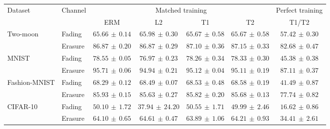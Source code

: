 \begin{tabular*}{\linewidth}{@{\extracolsep{\fill}}llccccc@{}}
\toprule
\multirow{2}{*}{Dataset} & \multirow{2}{*}{Channel} & \multicolumn{4}{c}{Matched training} & Perfect training \\
\cmidrule(lr){3-6}\cmidrule(l){7-7}
 & & ERM & L2 & T1 & T2 & T1/T2 \\
\midrule
\multirow{2}{*}{Two-moon} & Fading & $65.66\,\pm\,0.14$ & $\mathbf{65.98}\,\pm\,0.30$ & $65.67\,\pm\,0.58$ & $65.67\,\pm\,0.58$ & $57.42\,\pm\,0.30$ \\
 & Erasure & $86.87\,\pm\,0.20$ & $86.87\,\pm\,0.29$ & $87.10\,\pm\,0.36$ & $\mathbf{87.15}\,\pm\,0.33$ & $82.68\,\pm\,0.47$ \\
\midrule[0.25pt]
\multirow{2}{*}{MNIST} & Fading & $\mathbf{78.55}\,\pm\,0.05$ & $76.97\,\pm\,0.23$ & $78.26\,\pm\,0.34$ & $78.33\,\pm\,0.30$ & $45.38\,\pm\,0.38$ \\
 & Erasure & $\mathbf{95.71}\,\pm\,0.06$ & $94.94\,\pm\,0.21$ & $95.12\,\pm\,0.04$ & $95.11\,\pm\,0.19$ & $87.11\,\pm\,0.37$ \\
\midrule[0.25pt]
\multirow{2}{*}{Fashion-MNIST} & Fading & $68.29\,\pm\,0.12$ & $68.49\,\pm\,0.07$ & $68.53\,\pm\,0.48$ & $\mathbf{68.58}\,\pm\,0.19$ & $41.49\,\pm\,0.87$ \\
 & Erasure & $\mathbf{85.93}\,\pm\,0.15$ & $85.63\,\pm\,0.27$ & $85.82\,\pm\,0.20$ & $85.68\,\pm\,0.13$ & $77.74\,\pm\,0.82$ \\
\midrule[0.25pt]
\multirow{2}{*}{CIFAR-10} & Fading & $50.10\,\pm\,1.72$ & $37.94\,\pm\,24.20$ & $\mathbf{50.55}\,\pm\,1.71$ & $49.99\,\pm\,2.46$ & $16.62\,\pm\,0.86$ \\
 & Erasure & $64.10\,\pm\,0.65$ & $\mathbf{64.61}\,\pm\,0.47$ & $63.89\,\pm\,1.06$ & $64.21\,\pm\,0.93$ & $34.41\,\pm\,2.61$ \\
\bottomrule
\end{tabular*}
